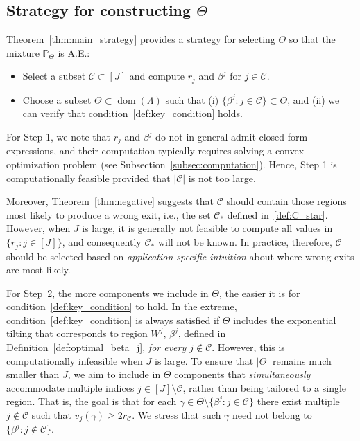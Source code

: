 \documentclass[aap,preprint]{imsart}
\newcommand{\Pro}{{\mathbb{P}}}
\theoremstyle{plain}
\theoremstyle{definition}
\begin{document}

\subsection{Strategy for constructing $\Theta$}\label{subsec:strategy}

Theorem~\ref{thm:main_strategy} provides a strategy for selecting $\Theta$ so that the mixture $\Pro_\Theta$ is A.E.:  
\begin{itemize}
    \item[\textbf{Step 1.}] Select a subset $\mathcal{C} \subset [J]$ and compute $r_j$ and $\beta^j$ for $j \in \mathcal{C}$. 
    
    \item[\textbf{Step 2.}] Choose a subset $\Theta \subset \operatorname{dom}(\Lambda)$ such that (i) $\{\beta^j : j \in \mathcal{C}\} \subset \Theta$, and (ii)   we can verify that condition~\eqref{def:key_condition} holds.
\end{itemize}

For Step 1, we note that $r_j$ and $\beta^j$ do not in general admit closed-form expressions, and their computation typically requires solving a convex optimization problem (see Subsection~\ref{subsec:computation}). Hence, Step 1 is computationally feasible provided that $|\mathcal{C}|$ is not too large.

 

  Moreover,  Theorem~\ref{thm:negative} suggests that $\mathcal{C}$ should contain those regions most likely to produce a wrong exit, i.e., the set $\mathcal{C}_*$ defined in~\eqref{def:C_star}. However, when $J$ is large, it is generally not feasible to compute all values in $\{r_j : j \in [J]\}$, and consequently $\mathcal{C}_*$ will not be known. In practice, therefore, $\mathcal{C}$ should be selected based on \emph{application-specific intuition} about where wrong exits are most likely. 





For Step~2, the more components we include in $\Theta$, the easier it is for condition~\eqref{def:key_condition} to hold. In the extreme, condition~\eqref{def:key_condition} is always satisfied if $\Theta$ includes the exponential tilting that corresponds to region $W^j$, $\beta^j$, defined in Definition~\ref{def:optimal_beta_j},
 \textit{for every  $j \notin \mathcal{C}$}. However,  this is computationally infeasible when $J$ is large. To ensure that $|\Theta|$ remains much smaller than $J$, we aim to include in $\Theta$ components that \emph{simultaneously} accommodate multiple indices $j \in [J] \setminus \mathcal{C}$, rather than being tailored to a single region. That is,  the goal is that for each $\gamma \in \Theta \setminus \{\beta^j : j \in \mathcal{C}\}$  there exist multiple $j \notin \mathcal{C}$ such that $v_j(\gamma) \geq 2 r_\mathcal{C}$. We stress that such $\gamma$ need not belong to $\{\beta^j : j \notin \mathcal{C}\}$.
\end{document}
